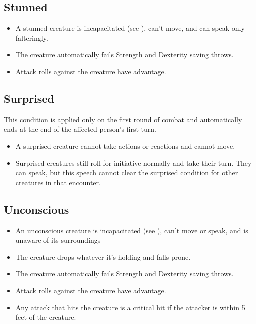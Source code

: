 \subsection{Stunned\label{condition:stunned}}
\begin{itemize}
\item A stunned creature is incapacitated (see ), can't move, and can speak only falteringly.
\item The creature automatically fails Strength and Dexterity saving throws.
\item Attack rolls against the creature have advantage.
\end{itemize}

\subsection{Surprised}\label{condition:surprised}
This condition is applied only on the first round of combat and automatically ends at the end of the affected person's first turn.
\begin{itemize}
	\item A surprised creature cannot take actions or reactions and cannot move. 
	\item Surprised creatures still roll for initiative normally and take their turn. They can speak, but this speech cannot clear the surprised condition for other creatures in that encounter.
\end{itemize}

\subsection{Unconscious\label{condition:unconscious}}
\begin{itemize}
\item An unconscious creature is incapacitated (see ), can't move or speak, and is unaware of its surroundings
\item The creature drops whatever it's holding and falls prone.
\item The creature automatically fails Strength and Dexterity saving throws.
\item Attack rolls against the creature have advantage.
\item Any attack that hits the creature is a critical hit if the attacker is within 5 feet of the creature.
\end{itemize}
